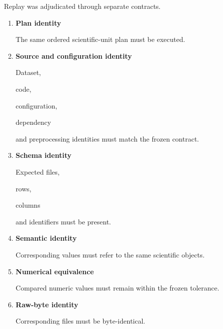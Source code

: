 \documentclass[11pt,a4paper,oneside]{report}
\providecommand{\term}[1]{\textbf{#1}}
\begin{document}
Replay was adjudicated through separate contracts.



\begin{enumerate}



\item

\term{Plan identity}



The same ordered scientific-unit plan must be executed.



\item

\term{Source and configuration identity}



Dataset,

code,

configuration,

dependency

and preprocessing identities must match the frozen contract.



\item

\term{Schema identity}



Expected files,

rows,

columns

and identifiers must be present.



\item

\term{Semantic identity}



Corresponding values must refer to the same scientific objects.



\item

\term{Numerical equivalence}



Compared numeric values must remain within the frozen tolerance.



\item

\term{Raw-byte identity}



Corresponding files must be byte-identical.



\end{enumerate}
\end{document}
